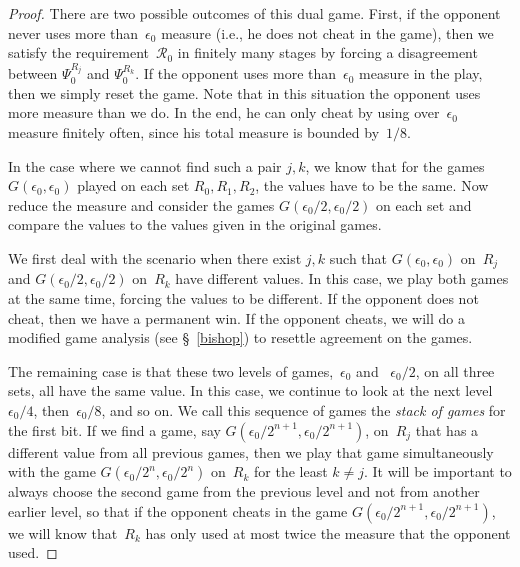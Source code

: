 \documentclass{LMCS}
\newcommand{\0}{\mathbf{0}}
\newcommand{\<}{\langle}
\renewcommand{\>}{\rangle}
\begin{document}
\begin{proof}
There are two possible outcomes of this dual game. First, if the opponent
never uses more than~$\epsilon_0$ measure (i.e., he does not cheat in the
game), then we satisfy the requirement~$\mathcal{R}_0$ in finitely many
stages by forcing a disagreement between $\Psi_0^{R_j}$ and $\Psi_0^{R_k}$.
If the opponent uses more than~$\epsilon_0$ measure in the play, then we
simply reset the game.  Note that in this situation the opponent uses more
measure than we do.  In the end, he can only cheat by using over~$\epsilon_0$
measure finitely often, since his total measure is bounded by~$1/8$.

In the case where we cannot find such a pair $j,k$, we know that for the
games $G(\epsilon_0,\epsilon_0)$ played on each set $R_0,R_1,R_2$, the values
have to be the same. Now reduce the measure and consider the games
$G(\epsilon_0/2,\epsilon_0/2)$ on each set and compare the values to the
values given in the original games.

We first deal with the scenario when there exist $j,k$ such that
$G(\epsilon_0,\epsilon_0)$ on~$R_j$ and $G(\epsilon_0/2,\epsilon_0/2)$
on~$R_k$ have different values. In this case, we play both games at the same
time, forcing the values to be different. If the opponent does not cheat,
then we have a permanent win. If the opponent cheats, we will do a modified
game analysis (see \S~\ref{bishop}) to resettle agreement on the games.

The remaining case is that these two levels of games,~$\epsilon_0$ and
~$\epsilon_0/2$, on all three sets, all have the same value. In this case, we
continue to look at the next level~$\epsilon_0/4$, then~$\epsilon_0/8$, and
so on.  We call this sequence of games the \emph{stack of games} for the
first bit.  If we find a game, say
$G(\epsilon_0/{2^{n+1}},\epsilon_0/{2^{n+1}})$, on~$R_j$ that has a different
value from all previous games, then we play that game simultaneously with the
game $G(\epsilon_0/{2^n},\epsilon_0/{2^n})$ on~$R_k$ for the least $k\neq j$.
It will be important to always choose the second game from the previous level
and not from another earlier level, so that if the opponent cheats in the
game $G(\epsilon_0/{2^{n+1}},\epsilon_0/{2^{n+1}})$, we will know that~$R_k$
has only used at most twice the measure that the opponent used.


\end{proof}
\end{document}
